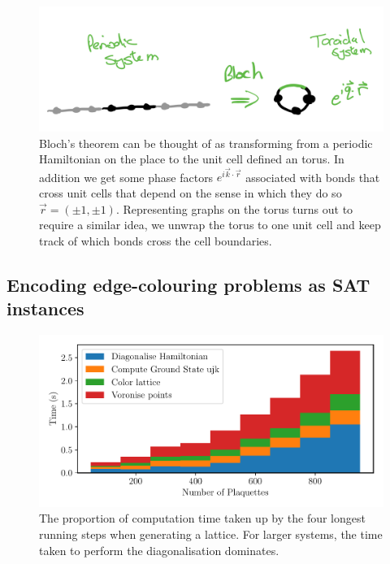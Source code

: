 \hypertarget{fig:bloch}{%
\begin{figure}
\centering
\includegraphics[width=1\textwidth,height=\textheight]{figure_code/amk_chapter/methods/bloch.png}
\caption[{Bloch's Theorem and the Torus}]{Bloch's theorem can be thought of as transforming from a periodic Hamiltonian on the place to the unit cell defined an torus. In addition we get some phase factors \(e^{i\vec{k}\cdot\vec{r}}\) associated with bonds that cross unit cells that depend on the sense in which they do so \(\vec{r} = (\pm1, \pm1)\). Representing graphs on the torus turns out to require a similar idea, we unwrap the torus to one unit cell and keep track of which bonds cross the cell boundaries.}
\label{fig:bloch}
\end{figure}
}

\hypertarget{encoding-edge-colouring-problems-as-sat-instances}{%
\subsection{Encoding edge-colouring problems as SAT instances}\label{encoding-edge-colouring-problems-as-sat-instances}}

\hypertarget{fig:times}{%
\begin{figure}
\centering
\includegraphics[width=1\textwidth,height=\textheight]{figure_code/amk_chapter/methods/times/times}
\caption[{Computation Time Spent on Different Procedures.}]{The proportion of computation time taken up by the four longest running steps when generating a lattice. For larger systems, the time taken to perform the diagonalisation dominates.}
\label{fig:times}
\end{figure}
}

